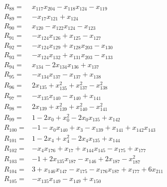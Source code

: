 \begin{align*}
R_{88} ={}& x_{117}x_{204} - x_{118}x_{124} - x_{119} \\[4pt]
R_{89} ={}& -x_{17}x_{121} + x_{124} \\[4pt]
R_{90} ={}& x_{120} - x_{122}x_{124} - x_{123} \\[4pt]
R_{91} ={}& -x_{124}x_{126} + x_{125} - x_{127} \\[4pt]
R_{92} ={}& -x_{124}x_{129} + x_{128}x_{203} - x_{130} \\[4pt]
R_{93} ={}& -x_{124}x_{132} + x_{131}x_{203} - x_{133} \\[4pt]
R_{94} ={}& x_{134} - 2x_{134}x_{136} + x_{137} \\[4pt]
R_{95} ={}& -x_{134}x_{137} - x_{137} + x_{138} \\[4pt]
R_{96} ={}& 2x_{135} + x_{135}^{2} + x_{137}^{2} - x_{138}^{2} \\[4pt]
R_{97} ={}& -x_{135}x_{140} - x_{140} + x_{141} \\[4pt]
R_{98} ={}& 2x_{139} + x_{139}^{2} + x_{140}^{2} - x_{141}^{2} \\[4pt]
R_{99} ={}& 1 - 2x_{0} + x_{0}^{2} - 2x_{0}x_{135} + x_{142} \\[4pt]
R_{100} ={}& -1 - x_{0}x_{140} + x_{3} - x_{139} + x_{141} + x_{142}x_{143} \\[4pt]
R_{101} ={}& 1 - 2x_{4} + x_{4}^{2} - 2x_{4}x_{135} + x_{144} \\[4pt]
R_{102} ={}& -x_{4}x_{176} + x_{17} + x_{144}x_{145} - x_{175} + x_{177} \\[4pt]
R_{103} ={}& -1 + 2x_{135}x_{187} - x_{146} + 2x_{187} - x_{187}^{2} \\[4pt]
R_{104} ={}& 3 + x_{146}x_{147} - x_{175} - x_{176}x_{187} + x_{177} + 6x_{211} \\[4pt]
R_{105} ={}& -x_{135}x_{149} - x_{149} + x_{150} \\[4pt]

\end{align*}
